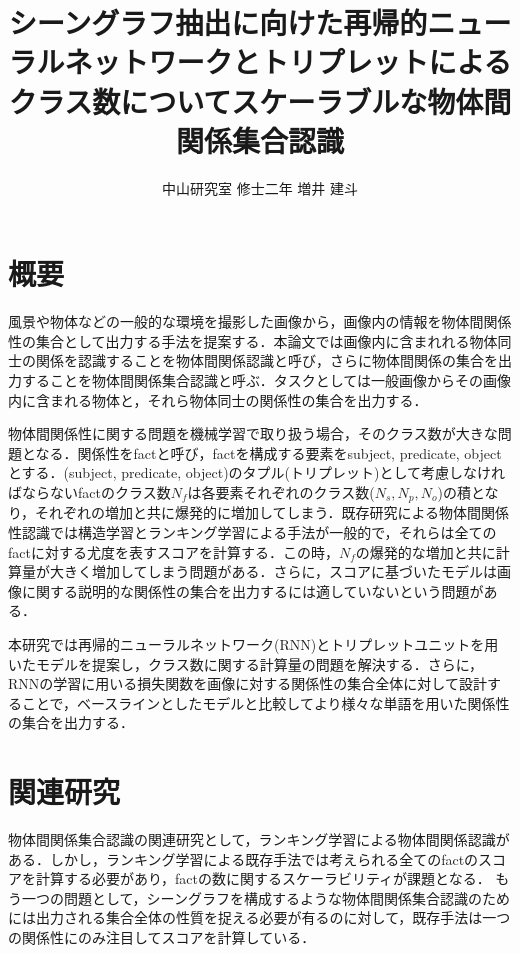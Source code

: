 

\title{シーングラフ抽出に向けた再帰的ニューラルネットワークとトリプレットによるクラス数についてスケーラブルな物体間関係集合認識}
\date{}
\author{中山研究室 修士二年 増井 建斗}

\maketitle



\section{概要}
風景や物体などの一般的な環境を撮影した画像から，画像内の情報を物体間関係性の集合として出力する手法を提案する．本論文では画像内に含まれれる物体同士の関係を認識することを物体間関係認識と呼び，さらに物体間関係の集合を出力することを物体間関係集合認識と呼ぶ．タスクとしては一般画像からその画像内に含まれる物体と，それら物体同士の関係性の集合を出力する．

物体間関係性に関する問題を機械学習で取り扱う場合，そのクラス数が大きな問題となる．関係性をfactと呼び，factを構成する要素をsubject, predicate, objectとする．(subject, predicate, object)のタプル(トリプレット)として考慮しなければならないfactのクラス数$N_f$は各要素それぞれのクラス数($N_s,N_p,N_o$)の積となり，それぞれの増加と共に爆発的に増加してしまう．既存研究による物体間関係性認識では構造学習とランキング学習による手法が一般的で，それらは全てのfactに対する尤度を表すスコアを計算する．この時，$N_f$の爆発的な増加と共に計算量が大きく増加してしまう問題がある．さらに，スコアに基づいたモデルは画像に関する説明的な関係性の集合を出力するには適していないという問題がある．

本研究では再帰的ニューラルネットワーク(RNN)とトリプレットユニットを用いたモデルを提案し，クラス数に関する計算量の問題を解決する．さらに，RNNの学習に用いる損失関数を画像に対する関係性の集合全体に対して設計することで，ベースラインとしたモデルと比較してより様々な単語を用いた関係性の集合を出力する．

\section{関連研究}
物体間関係集合認識の関連研究として，ランキング学習による物体間関係認識\cite{Sadeghi2011,CewuLuRanjayKrishnaMichaelBernstein,Atzmon2016}がある．しかし，ランキング学習による既存手法では考えられる全てのfactのスコアを計算する必要があり，factの数に関するスケーラビリティが課題となる．
もう一つの問題として，シーングラフを構成するような物体間関係集合認識のためには出力される集合全体の性質を捉える必要が有るのに対して，既存手法は一つの関係性にのみ注目してスコアを計算している．

